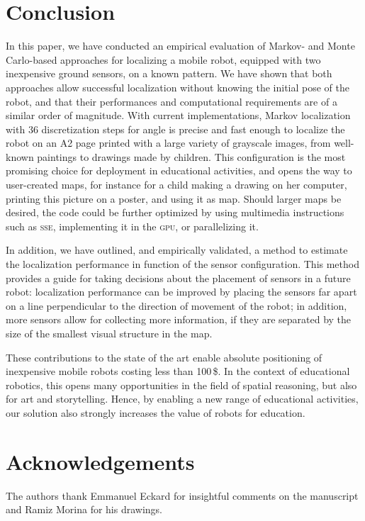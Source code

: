 \documentclass[letterpaper, 10pt, conference]{ieeeconf}
\begin{document}
\section{Conclusion}

In this paper, we have conducted an empirical evaluation of Markov- and Monte Carlo-based approaches for localizing a mobile robot, equipped with two inexpensive ground sensors, on a known pattern.
We have shown that both approaches allow successful localization without knowing the initial pose of the robot, and that their performances and computational requirements are of a similar order of magnitude.
With current implementations, Markov localization with 36 discretization steps for angle is precise and fast enough to localize the robot on an A2 page printed with a large variety of grayscale images, from well-known paintings to drawings made by children.
This configuration is the most promising choice for deployment in educational activities, and opens the way to user-created maps, for instance for a child making a drawing on her computer, printing this picture on a poster, and using it as map.
Should larger maps be desired, the code could be further optimized by using multimedia instructions such as \textsc{sse}, implementing it in the \textsc{gpu}, or parallelizing it.

In addition, we have outlined, and empirically validated, a method to estimate the localization performance in function of the sensor configuration.
This method provides a guide for taking decisions about the placement of sensors in a future robot:
localization performance can be improved by placing the sensors far apart on a line perpendicular to the direction of movement of the robot; in addition, more sensors allow for collecting more information, if they are separated by the size of the smallest visual structure in the map.

These contributions to the state of the art enable absolute positioning of inexpensive mobile robots costing less than 100\,\$.
In the context of educational robotics, this opens many opportunities in the field of spatial reasoning, but also for art and storytelling.
Hence, by enabling a new range of educational activities, our solution also strongly increases the value of robots for education.

\section{Acknowledgements}

The authors thank Emmanuel Eckard for insightful comments on the manuscript and Ramiz Morina for his drawings.



\end{document}
